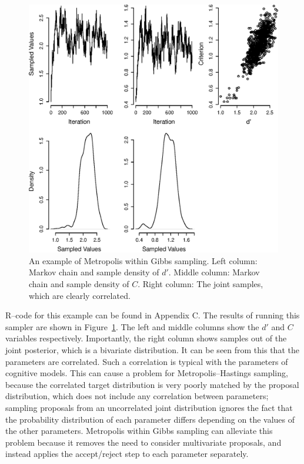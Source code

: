 \begin{figure}[!t]
    \begin{center}
        \includegraphics[width=\textwidth]{figs/don_GibbsExample.eps}
        \caption{An example of Metropolis within Gibbs sampling. Left column: Markov chain and sample density of $d'$. Middle column: Markov chain and sample density of $C$. Right column: The joint samples, which are clearly correlated.}
        \label{GibbsExample}
    \end{center}
\end{figure}

R--code for this example can be found in Appendix C. The results of running this sampler are shown in Figure~\ref{GibbsExample}. The left and middle columns show the $d'$  and $C$ variables respectively. Importantly, the right column shows samples out of the joint posterior, which is a bivariate distribution. It can be seen from this that the parameters are correlated. Such a correlation is typical with the parameters of cognitive models. This can cause a problem for Metropolis--Hastings sampling, because the correlated target distribution is very poorly matched by the proposal distribution, which does not include any correlation between parameters; sampling proposals from an uncorrelated joint distribution ignores the fact that the probability distribution of each parameter differs depending on the values of the other parameters. Metropolis within Gibbs sampling can alleviate this problem because it removes the need to consider multivariate proposals, and instead applies the accept/reject step to each parameter separately.

